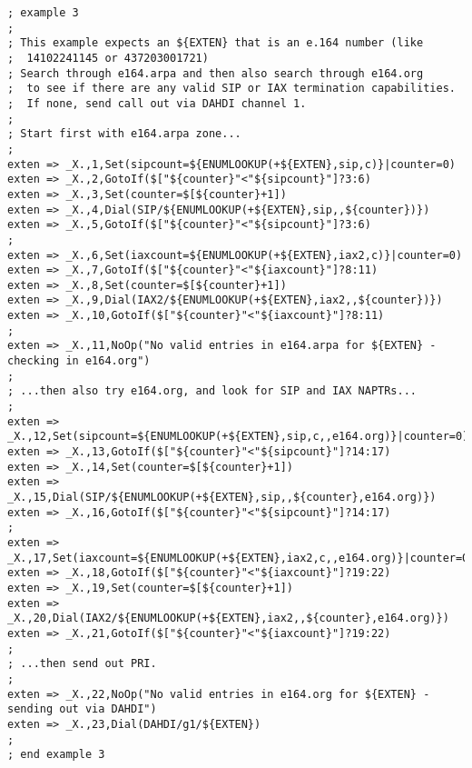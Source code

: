 \begin{astlisting}
\begin{verbatim}
; example 3
;
; This example expects an ${EXTEN} that is an e.164 number (like
;  14102241145 or 437203001721)
; Search through e164.arpa and then also search through e164.org
;  to see if there are any valid SIP or IAX termination capabilities.
;  If none, send call out via DAHDI channel 1.
;
; Start first with e164.arpa zone...
;
exten => _X.,1,Set(sipcount=${ENUMLOOKUP(+${EXTEN},sip,c)}|counter=0)
exten => _X.,2,GotoIf($["${counter}"<"${sipcount}"]?3:6)
exten => _X.,3,Set(counter=$[${counter}+1])
exten => _X.,4,Dial(SIP/${ENUMLOOKUP(+${EXTEN},sip,,${counter})})
exten => _X.,5,GotoIf($["${counter}"<"${sipcount}"]?3:6)
;
exten => _X.,6,Set(iaxcount=${ENUMLOOKUP(+${EXTEN},iax2,c)}|counter=0)
exten => _X.,7,GotoIf($["${counter}"<"${iaxcount}"]?8:11)
exten => _X.,8,Set(counter=$[${counter}+1])
exten => _X.,9,Dial(IAX2/${ENUMLOOKUP(+${EXTEN},iax2,,${counter})})
exten => _X.,10,GotoIf($["${counter}"<"${iaxcount}"]?8:11)
;
exten => _X.,11,NoOp("No valid entries in e164.arpa for ${EXTEN} - checking in e164.org")
;
; ...then also try e164.org, and look for SIP and IAX NAPTRs...
;
exten => _X.,12,Set(sipcount=${ENUMLOOKUP(+${EXTEN},sip,c,,e164.org)}|counter=0)
exten => _X.,13,GotoIf($["${counter}"<"${sipcount}"]?14:17)
exten => _X.,14,Set(counter=$[${counter}+1])
exten => _X.,15,Dial(SIP/${ENUMLOOKUP(+${EXTEN},sip,,${counter},e164.org)})
exten => _X.,16,GotoIf($["${counter}"<"${sipcount}"]?14:17)
;
exten => _X.,17,Set(iaxcount=${ENUMLOOKUP(+${EXTEN},iax2,c,,e164.org)}|counter=0)
exten => _X.,18,GotoIf($["${counter}"<"${iaxcount}"]?19:22)
exten => _X.,19,Set(counter=$[${counter}+1])
exten => _X.,20,Dial(IAX2/${ENUMLOOKUP(+${EXTEN},iax2,,${counter},e164.org)})
exten => _X.,21,GotoIf($["${counter}"<"${iaxcount}"]?19:22)
;
; ...then send out PRI.
;
exten => _X.,22,NoOp("No valid entries in e164.org for ${EXTEN} - sending out via DAHDI")
exten => _X.,23,Dial(DAHDI/g1/${EXTEN})
;
; end example 3

\end{verbatim}
\end{astlisting}
